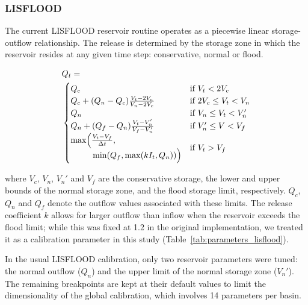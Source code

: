 \documentclass[hess, manuscript]{copernicus}
\begin{document}
\subsubsection{LISFLOOD}
\label{sec:lisflood}

The current LISFLOOD reservoir routine \citep{Burek2013a, Zajac2017} operates as a piecewise linear storage-outflow relationship. The release is determined by the storage zone in which the reservoir resides at any given time step: conservative, normal or flood.

\begin{equation}
    \label{eq:lisflood}
    \begin{split}
    & Q_t = \\
    & \begin{cases}
        Q_c & \text{if } V_t < 2 V_c \\
        Q_c + ( Q_n - Q_c ) \frac{V_t - 2 V_c}{V_n - 2 V_c} & \text{if } 2 V_c \leq V_t < V_n \\
        Q_n & \text{if } V_n \leq V_t < V_n' \\
        Q_n + ( Q_f - Q_n ) \frac{V_t - V_n'}{V_f - V_n'} & \text{if } V_n' \leq V < V_f \\
        \begin{aligned} 
            \max \Bigl( & \tfrac{V_t - V_f}{\Delta t}, \\
            & \min(Q_f, \max ( k I_t, Q_n ) ) \Bigr) 
        \end{aligned} & \text{if } V_t > V_f
    \end{cases}
    \end{split}
\end{equation}

where $V_c$, $V_n$, $V_n'$ and $V_f$ are the conservative storage, the lower and upper bounds of the normal storage zone, and the flood storage limit, respectively. $Q_c$, $Q_n$ and $Q_f$ denote the outflow values associated with these limits. The release coefficient $k$ allows for larger outflow than inflow when the reservoir exceeds the flood limit; while this was fixed at 1.2 in the original implementation, we treated it as a calibration parameter in this study (Table~\ref{tab:parameters_lisflood}).

In the usual LISFLOOD calibration, only two reservoir parameters were tuned: the normal outflow ($Q_n$) and the upper limit of the normal storage zone ($V_n'$). The remaining breakpoints are kept at their default values to limit the dimensionality of the global calibration, which involves 14 parameters per basin.
\end{document}

